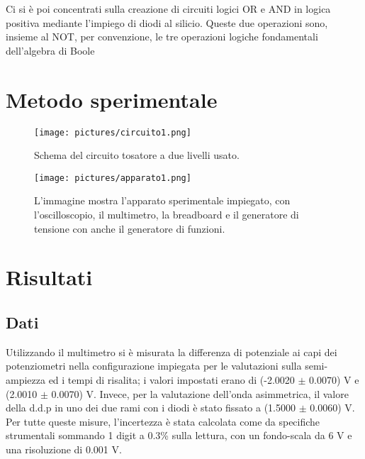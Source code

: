 \documentclass[a4paper,11pt]{article}
\begin{document}
	Ci si è poi concentrati sulla creazione di circuiti logici OR e AND in logica positiva mediante l'impiego di diodi al silicio. Queste due operazioni sono, insieme al NOT, per convenzione, le tre operazioni logiche fondamentali dell'algebra di Boole 
	
	\section{Metodo sperimentale}
	
	
	\begin{figure}
		\centering
		\texttt{[image: pictures/circuito1.png]}
		\caption{Schema del circuito tosatore a due livelli usato.}
		\label{fig:circuito}
	\end{figure}
	
	\begin{figure}
		\centering
		\texttt{[image: pictures/apparato1.png]}
		\caption{L'immagine mostra l'apparato sperimentale impiegato, con l'oscilloscopio, il multimetro, la breadboard e il generatore di tensione con anche il generatore di funzioni. }
		\label{fig:apparato}
	\end{figure}
	
	\FloatBarrier
	\section{Risultati}
	
	
	
	\subsection{Dati}
	Utilizzando il multimetro si è misurata la differenza di potenziale ai capi dei potenziometri nella configurazione impiegata per le valutazioni sulla semi-ampiezza ed i tempi di risalita; i valori impostati erano di (-2.0020 $\pm$ 0.0070) V e (2.0010 $\pm$ 0.0070) V. Invece, per la valutazione dell'onda asimmetrica, il valore della d.d.p in uno dei due rami con i diodi è stato fissato a (1.5000 $\pm$ 0.0060) V. Per tutte queste misure, l'incertezza è stata calcolata come da specifiche strumentali sommando 1 digit a 0.3\% sulla lettura, con un fondo-scala da 6 V e una risoluzione di 0.001 V. 
	
	
	
\end{document}

